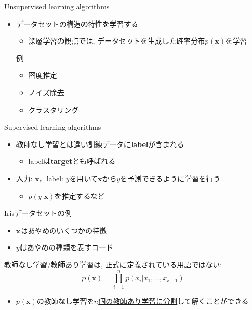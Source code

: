 \documentclass[dvipdfmx, 10pt]{beamer}
\newcommand{\green}[1]{\textcolor{green!40!black}{#1}}
\begin{document}

\begin{frame}{Unsupervised learning algorithms}
  \begin{itemize}
    \item データセットの構造の特性を学習する
    \begin{itemize}
      \item 深層学習の観点では, データセットを生成した確率分布$p(\bm x)$を学習
    \end{itemize}
    \begin{exampleblock}{例}
      \begin{itemize}
        \item 密度推定
        \item ノイズ除去
        \item クラスタリング
      \end{itemize}
    \end{exampleblock}
  \end{itemize}
\end{frame}


\begin{frame}{Supervised learning algorithms}
  \begin{itemize}
    \item 教師なし学習とは違い訓練データに{\bf label}が含まれる
    \begin{itemize}
      \item labelは{\bf target}とも呼ばれる
    \end{itemize}
    \item 入力: $\bm{x}$，label: $y$を用いて$\bm{x}$から$y$を予測できるように学習を行う
    \begin{itemize}
      \item $p(y|\bm x)$を推定するなど
    \end{itemize}
  \end{itemize}
  \begin{exampleblock}{Irisデータセットの例}
    \begin{itemize}
      \item $\bm{x}$はあやめのいくつかの特徴
      \item $y$はあやめの種類を表すコード
    \end{itemize}
  \end{exampleblock}
  
  \begin{description} \footnotesize
  \item[\green{補足}] 教師なし学習/教師あり学習は, 正式に定義されている用語ではない:
	  \[
	  p(\bm x)=\prod_{i=1}^{n} p(x_{i} | x_{1}, \ldots, x_{i-1})
	  \]
	  \begin{itemize}
	  \item $p(\bm x)$の教師なし学習を\underline{$n$個の教師あり学習に分割}して解くことができる
	  \end{itemize}
  \end{description}
\end{frame}
\end{document}
